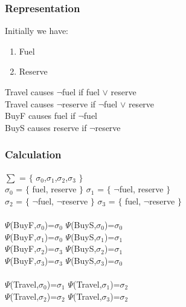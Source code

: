 \documentclass[11pt]{article}
\begin{document}
	\subsubsection{Representation}\label{par:p201}
	Initially we have:
	\begin{enumerate}
		\item Fuel
		\item Reserve
	\end{enumerate}
	Travel causes $\neg$fuel if fuel $\vee$ reserve\\
	Travel causes $\neg$reserve if $\neg$fuel $\vee$ reserve\\
	BuyF causes fuel if $\neg$fuel\\ 
	BuyS causes reserve if $\neg$reserve\\
	\subsubsection{Calculation}\label{par:p301}\par
	$\sum$ = $\lbrace$ $\sigma_{0}$,$\sigma_{1}$,$\sigma_{2}$,$\sigma_{3}$ $\rbrace$\\
	$\sigma_{0}$ = $\lbrace$ fuel, reserve $\rbrace$ \indent $\sigma_{1}$ = $\lbrace$ $\neg$fuel, reserve $\rbrace$\\
	$\sigma_{2}$ = $\lbrace$ $\neg$fuel, $\neg$reserve $\rbrace$ \indent $\sigma_{3}$ = $\lbrace$ fuel, $\neg$reserve $\rbrace$\\
	\\
	$\Psi$(BuyF,$\sigma_{0}$)=$\sigma_{0}$ \indent $\Psi$(BuyS,$\sigma_{0}$)=$\sigma_{0}$\\
	$\Psi$(BuyF,$\sigma_{1}$)=$\sigma_{0}$ \indent $\Psi$(BuyS,$\sigma_{1}$)=$\sigma_{1}$\\
	$\Psi$(BuyF,$\sigma_{2}$)=$\sigma_{3}$ \indent $\Psi$(BuyS,$\sigma_{2}$)=$\sigma_{1}$\\
	$\Psi$(BuyF,$\sigma_{3}$)=$\sigma_{3}$ \indent $\Psi$(BuyS,$\sigma_{3}$)=$\sigma_{0}$\\
	\\
	$\Psi$(Travel,$\sigma_{0}$)=$\sigma_{1}$\indent
	$\Psi$(Travel,$\sigma_{1}$)=$\sigma_{2}$\\
	$\Psi$(Travel,$\sigma_{2}$)=$\sigma_{2}$\indent
	$\Psi$(Travel,$\sigma_{3}$)=$\sigma_{2}$\\
\end{document}
